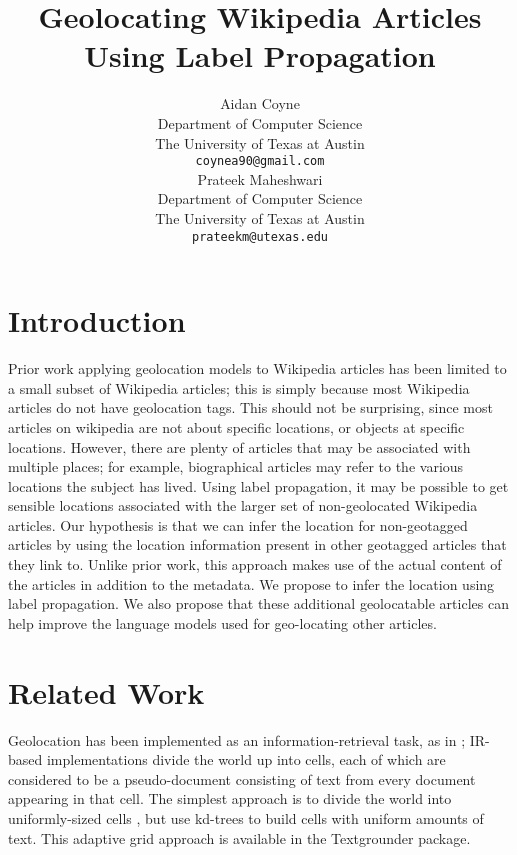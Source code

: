 \documentclass[11pt]{article}
\title{Geolocating Wikipedia Articles Using Label Propagation}
\author{Aidan Coyne \\
    Department of Computer Science\\
    The University of Texas at Austin\\
  {\tt coynea90@gmail.com} \\ 
  \And
  Prateek Maheshwari\\
     Department of Computer Science\\
    The University of Texas at Austin\\
  {\tt prateekm@utexas.edu}}
\date{}
\begin{document}
\maketitle

\section{Introduction}
Prior work applying geolocation models to Wikipedia articles 
has been limited to a small subset of Wikipedia articles;
this is simply because most Wikipedia articles do not have geolocation tags.
This should not be surprising, since most articles on wikipedia are not about specific locations, 
or objects at specific locations.
However, there are plenty of articles that may be associated with multiple places; 
for example, biographical articles may refer to the various locations the subject has lived.
Using label propagation, it may be possible to get sensible locations associated with the larger set of non-geolocated Wikipedia articles.
Our hypothesis is that we can infer the location for non-geotagged articles 
by using the location information present in other geotagged articles that they link to. 
Unlike prior work, this approach makes use of the actual content of the articles in addition to the metadata. 
We propose to infer the location using label propagation.
We also propose that these additional geolocatable articles can help improve the language models used for geo-locating other articles.

\section{Related Work}
Geolocation has been implemented as an information-retrieval task, as in
\cite{skiles:12}; IR-based implementations divide the world up into cells, each
of which are considered to be a pseudo-document consisting of text from every
document appearing in that cell.
The simplest approach is to divide the world into uniformly-sized cells %
, but \cite{rolleretal:12} use kd-trees to build cells with uniform amounts of text.
This adaptive grid approach is available in the Textgrounder package.

\par
\cite{talukdar:09} \cite{talukdar:10}
\end{document}
